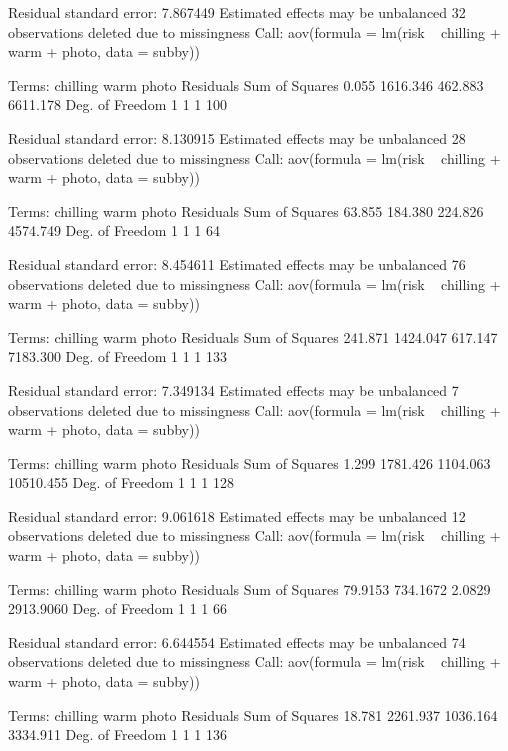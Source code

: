 \documentclass{article}\usepackage[]{graphicx}\usepackage[]{color}
\begin{document}
Residual standard error: 7.867449
Estimated effects may be unbalanced
32 observations deleted due to missingness
Call:
   aov(formula = lm(risk ~ chilling + warm + photo, data = subby))

Terms:
                chilling     warm    photo Residuals
Sum of Squares     0.055 1616.346  462.883  6611.178
Deg. of Freedom        1        1        1       100

Residual standard error: 8.130915
Estimated effects may be unbalanced
28 observations deleted due to missingness
Call:
   aov(formula = lm(risk ~ chilling + warm + photo, data = subby))

Terms:
                chilling     warm    photo Residuals
Sum of Squares    63.855  184.380  224.826  4574.749
Deg. of Freedom        1        1        1        64

Residual standard error: 8.454611
Estimated effects may be unbalanced
76 observations deleted due to missingness
Call:
   aov(formula = lm(risk ~ chilling + warm + photo, data = subby))

Terms:
                chilling     warm    photo Residuals
Sum of Squares   241.871 1424.047  617.147  7183.300
Deg. of Freedom        1        1        1       133

Residual standard error: 7.349134
Estimated effects may be unbalanced
7 observations deleted due to missingness
Call:
   aov(formula = lm(risk ~ chilling + warm + photo, data = subby))

Terms:
                 chilling      warm     photo Residuals
Sum of Squares      1.299  1781.426  1104.063 10510.455
Deg. of Freedom         1         1         1       128

Residual standard error: 9.061618
Estimated effects may be unbalanced
12 observations deleted due to missingness
Call:
   aov(formula = lm(risk ~ chilling + warm + photo, data = subby))

Terms:
                 chilling      warm     photo Residuals
Sum of Squares    79.9153  734.1672    2.0829 2913.9060
Deg. of Freedom         1         1         1        66

Residual standard error: 6.644554
Estimated effects may be unbalanced
74 observations deleted due to missingness
Call:
   aov(formula = lm(risk ~ chilling + warm + photo, data = subby))

Terms:
                chilling     warm    photo Residuals
Sum of Squares    18.781 2261.937 1036.164  3334.911
Deg. of Freedom        1        1        1       136
\end{document}
